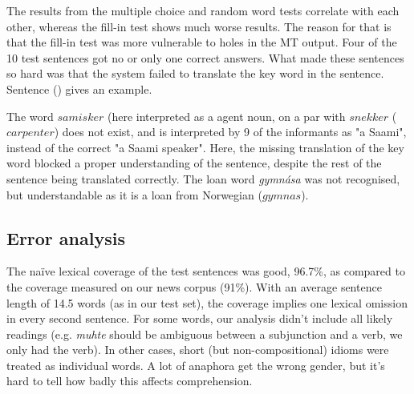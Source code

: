 The results from the multiple choice and random word tests correlate
with each other, whereas the fill-in test shows much worse results.
The reason for that is that the fill-in test was more vulnerable to
holes in the MT output. Four of the 10 test sentences got no or only
one correct answers. What made these sentences so hard was that the
system failed to translate the key word in the sentence. Sentence
() gives an example.



The word $samisker$ (here interpreted as a agent noun, on a par with
$snekker$ ($carpenter$) does not exist, and is interpreted by 9 of the
informants as "a Saami", instead of the correct "a Saami speaker".
Here, the missing translation of the key word blocked a proper
understanding of the sentence, despite the rest of the sentence being
translated correctly. The loan word \textit{gymn\'{a}sa} was not
recognised, but understandable as it is a loan from Norwegian
($gymnas$).



\subsection{Error analysis}



The na\"{i}ve lexical coverage of the test sentences was good, 96.7\%, 
as compared to the coverage measured on our news corpus (91\%). With
an average sentence length of 14.5 words (as in our test set), the coverage
implies one lexical omission in every second sentence. For
some words, our analysis didn't include all likely readings (e.g.
\textit{muhte} should be ambiguous between a subjunction and a verb,
we only had the verb). In other cases, short (but non-compositional)
idioms were treated as individual words. A lot of anaphora get the
wrong gender, but it's hard to tell how badly this affects
comprehension.


